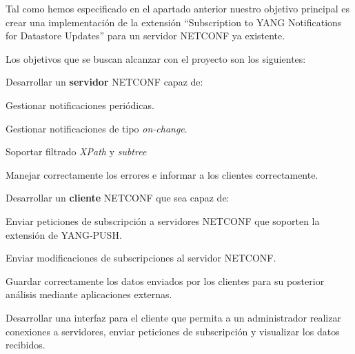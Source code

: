Tal como hemos especificado en el apartado anterior nuestro objetivo principal es crear una implementación de la extensión ``Subscription to YANG Notifications for Datastore Updates'' para un servidor NETCONF ya existente.

Los objetivos que se buscan alcanzar con el proyecto son los siguientes:

\begin{objetive}
    \item Desarrollar un \textbf{servidor} NETCONF capaz de:
        \begin{objetive}
            \item Gestionar notificaciones periódicas.
            \item Gestionar notificaciones de tipo \textit{on-change}.
            \item Soportar filtrado \textit{XPath} y \textit{subtree}
            \item Manejar correctamente los errores e informar a los clientes correctamente.
        \end{objetive}    
    
    \item Desarrollar un \textbf{cliente} NETCONF que sea capaz de:
        \begin{objetive}
            \item Enviar peticiones de subscripción a servidores NETCONF que soporten la extensión de YANG-PUSH.
            \item Enviar modificaciones de subscripciones al servidor NETCONF.
            \item Guardar correctamente los datos enviados por los clientes para su posterior análisis mediante aplicaciones externas.
        \end{objetive}    
    \item Desarrollar una interfaz para el cliente que permita a un administrador realizar conexiones a servidores, enviar peticiones de subscripción y visualizar los datos recibidos.
\end{objetive}



